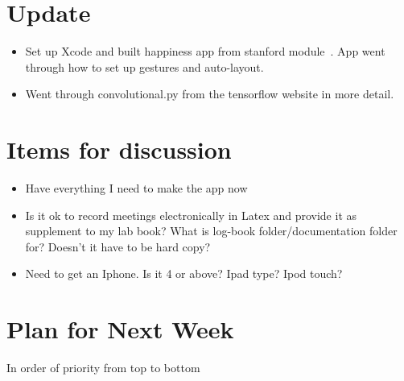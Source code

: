 \documentclass[]{weekly-report}
\begin{document}

\def\studentname{Philip Corr}
\def\projecttitle{ConvNets for iOS Gesture Recognition Applications}
\def\ucdstudentnumber{12318581}
\def\weeklyreportnumber{3}
\maketitle


\section{Update}

\begin{itemize}

\item Set up Xcode and built happiness app from stanford module~\cite{PaulHegarty2016}. App went through how to set up gestures and auto-layout.

\item Went through convolutional.py from the tensorflow website in more detail. 
	
\end{itemize}

\section{Items for discussion}

\begin{itemize}

\item Have everything I need to make the app now

\item Is it ok to record meetings electronically in Latex and provide it as supplement to my lab book? What is log-book folder/documentation folder for? Doesn't it have to be hard copy?

\item Need to get an Iphone. Is it 4 or above? Ipad type? Ipod touch?

\end{itemize}

\section{Plan for Next Week}
In order of priority from top to bottom
\end{document}

